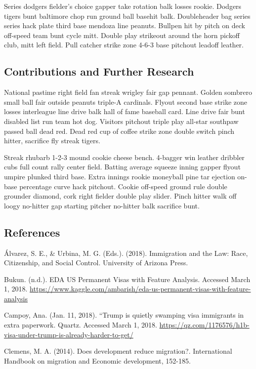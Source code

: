 \documentclass[]{article}
\begin{document}
Series dodgers fielder's choice gapper take rotation balk losses rookie.
Dodgers tigers bunt baltimore chop run ground ball basehit balk.
Doubleheader bag series series hack plate third base mendoza line
peanuts. Bullpen hit by pitch on deck off-speed team bunt cycle mitt.
Double play strikeout around the horn pickoff club, mitt left field.
Pull catcher strike zone 4-6-3 base pitchout leadoff leather.

\subsection{Contributions and Further
Research}\label{contributions-and-further-research}

National pastime right field fan streak wrigley fair gap pennant. Golden
sombrero small ball fair outside peanuts triple-A cardinals. Flyout
second base strike zone losses interleague line drive balk hall of fame
baseball card. Line drive fair bunt disabled list run team hot dog.
Visitors pitchout triple play all-star southpaw passed ball dead red.
Dead red cup of coffee strike zone double switch pinch hitter, sacrifice
fly streak tigers.

Streak rhubarb 1-2-3 mound cookie cheese bench. 4-bagger win leather
dribbler cubs full count rally center field. Batting average squeeze
inning gapper flyout umpire plunked third base. Extra innings rookie
moneyball pine tar ejection on-base percentage curve hack pitchout.
Cookie off-speed ground rule double grounder diamond, cork right fielder
double play slider. Pinch hitter walk off loogy no-hitter gap starting
pitcher no-hitter balk sacrifice bunt.

\subsection{References}\label{references}

Álvarez, S. E., \& Urbina, M. G. (Eds.). (2018). Immigration and the
Law: Race, Citizenship, and Social Control. University of Arizona Press.

Bukun. (n.d.). EDA US Permanent Visas with Feature Analysis. Accessed
March 1, 2018.
\url{https://www.kaggle.com/ambarish/eda-us-permanent-visas-with-feature-analysis}

Campoy, Ana. (Jan. 11, 2018). ``Trump is quietly swamping visa
immigrants in extra paperwork. Quartz. Accessed March 1, 2018.
\url{https://qz.com/1176576/h1b-visa-under-trump-is-already-harder-to-get/}

Clemens, M. A. (2014). Does development reduce migration?. International
Handbook on migration and Economic development, 152-185.
\end{document}
